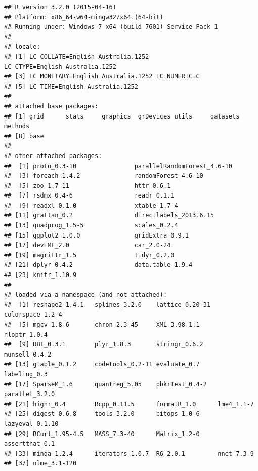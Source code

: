 \documentclass{grattan}\usepackage[]{graphicx}\usepackage[]{color}
\makeatletter
\newenvironment{kframe}{%
 \def\at@end@of@kframe{}%
 \ifinner\ifhmode%
  \def\at@end@of@kframe{\end{minipage}}%
  \begin{minipage}{\columnwidth}%
 \fi\fi%
 \def\FrameCommand##1{\hskip\@totalleftmargin \hskip-\fboxsep
 \colorbox{shadecolor}{##1}\hskip-\fboxsep
     \hskip-\linewidth \hskip-\@totalleftmargin \hskip\columnwidth}%
 \MakeFramed {\advance\hsize-\width
   \@totalleftmargin\z@ \linewidth\hsize
   \@setminipage}}%
 {\par\unskip\endMakeFramed%
 \at@end@of@kframe}
\newenvironment{knitrout}{}{} %
\makeatother
\begin{document}
\begin{knitrout}
\color{fgcolor}\begin{kframe}
\begin{verbatim}
## R version 3.2.0 (2015-04-16)
## Platform: x86_64-w64-mingw32/x64 (64-bit)
## Running under: Windows 7 x64 (build 7601) Service Pack 1
## 
## locale:
## [1] LC_COLLATE=English_Australia.1252  LC_CTYPE=English_Australia.1252   
## [3] LC_MONETARY=English_Australia.1252 LC_NUMERIC=C                      
## [5] LC_TIME=English_Australia.1252    
## 
## attached base packages:
## [1] grid      stats     graphics  grDevices utils     datasets  methods  
## [8] base     
## 
## other attached packages:
##  [1] proto_0.3-10                parallelRandomForest_4.6-10
##  [3] foreach_1.4.2               randomForest_4.6-10        
##  [5] zoo_1.7-11                  httr_0.6.1                 
##  [7] rsdmx_0.4-6                 readr_0.1.1                
##  [9] readxl_0.1.0                xtable_1.7-4               
## [11] grattan_0.2                 directlabels_2013.6.15     
## [13] quadprog_1.5-5              scales_0.2.4               
## [15] ggplot2_1.0.0               gridExtra_0.9.1            
## [17] devEMF_2.0                  car_2.0-24                 
## [19] magrittr_1.5                tidyr_0.2.0                
## [21] dplyr_0.4.2                 data.table_1.9.4           
## [23] knitr_1.10.9               
## 
## loaded via a namespace (and not attached):
##  [1] reshape2_1.4.1   splines_3.2.0    lattice_0.20-31  colorspace_1.2-4
##  [5] mgcv_1.8-6       chron_2.3-45     XML_3.98-1.1     nloptr_1.0.4    
##  [9] DBI_0.3.1        plyr_1.8.3       stringr_0.6.2    munsell_0.4.2   
## [13] gtable_0.1.2     codetools_0.2-11 evaluate_0.7     labeling_0.3    
## [17] SparseM_1.6      quantreg_5.05    pbkrtest_0.4-2   parallel_3.2.0  
## [21] highr_0.4        Rcpp_0.11.5      formatR_1.0      lme4_1.1-7      
## [25] digest_0.6.8     tools_3.2.0      bitops_1.0-6     lazyeval_0.1.10 
## [29] RCurl_1.95-4.5   MASS_7.3-40      Matrix_1.2-0     assertthat_0.1  
## [33] minqa_1.2.4      iterators_1.0.7  R6_2.0.1         nnet_7.3-9      
## [37] nlme_3.1-120
\end{verbatim}
\end{kframe}
\end{knitrout}
\twocolumn

\printbibliography
\end{document}

